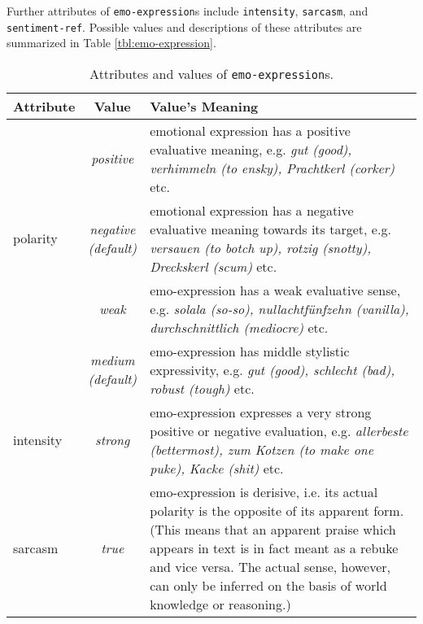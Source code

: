 \documentclass[11pt,a4paper]{article}
\newlength{\clmnwidth}
\theoremstyle{mytheoremstyle}
\begin{document}
Further attributes of \texttt{emo-expression}s include \texttt{intensity},
\texttt{sarcasm}, and \texttt{sentiment-ref}.  Possible values and
descriptions of these attributes are summarized in Table
\ref{tbl:emo-expression}.
\begin{center}
  \begin{table}[ht]
    \caption{Attributes and values of \texttt{emo-expression}s.}
    \begin{tabular}{|l|c|p{0.935\clmnwidth}|}\hline
      Attribute & Value & Value's Meaning\\\hline

      & \textit{positive} & emotional expression has a positive
      evaluative meaning, e.g. \textit{gut (good), verhimmeln (to
        ensky), Prachtkerl (corker)} etc.\\\cline{2-3}

      \multirow{-2}{*}{polarity} & \textit{negative\newline(default)}
      & emotional expression has a negative evaluative meaning towards
      its target, e.g. \textit{versauen (to botch up), rotzig
        (snotty), Dreckskerl (scum)} etc.\\\hline


      & \textit{weak} & emo-expression has a weak evaluative sense,
      e.g. \textit{solala (so-so), nullachtf\"unfzehn (vanilla),
        durchschnittlich (mediocre)} etc.\\\cline{2-3}

      & \textit{medium\newline(default)} & emo-expression has middle
      stylistic expressivity, e.g. \textit{gut (good), schlecht (bad),
        robust (tough)} etc.\\\cline{2-3}

      \multirow{-3}{*}{intensity} & \textit{strong} & emo-expression
      expresses a very strong positive or negative evaluation,
      e.g. \textit{allerbeste (bettermost), zum Kotzen (to make one
        puke), Kacke (shit)} etc.\\\hline


      \multirow{2}{*}{sarcasm} & \textit{true} & emo-expression is
      derisive, i.e. its actual polarity is the opposite of its
      apparent form. (This means that an apparent praise which appears
      in text is in fact meant as a rebuke and vice versa. The actual
      sense, however, can only be inferred on the basis of world
      knowledge or reasoning.)\\\cline{2-3}


\end{tabular}
\end{table}
\end{center}
\end{document}
